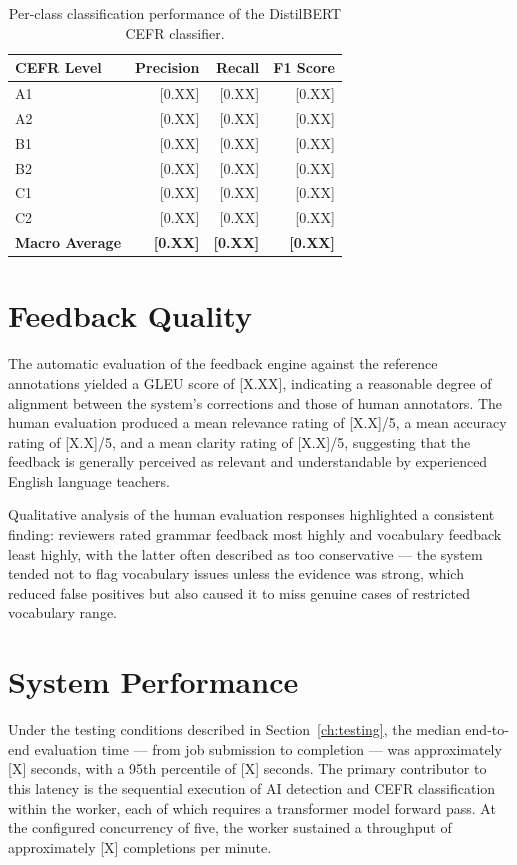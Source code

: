 \documentclass[12pt, a4paper]{report}
\begin{document}
\begin{table}[H]
\centering
\caption{Per-class classification performance of the DistilBERT CEFR classifier.}
\label{tab:classification}
\begin{tabular}{@{}lrrr@{}}
\toprule
\textbf{CEFR Level} & \textbf{Precision} & \textbf{Recall} & \textbf{F1 Score} \\
\midrule
A1 & [0.XX] & [0.XX] & [0.XX] \\
A2 & [0.XX] & [0.XX] & [0.XX] \\
B1 & [0.XX] & [0.XX] & [0.XX] \\
B2 & [0.XX] & [0.XX] & [0.XX] \\
C1 & [0.XX] & [0.XX] & [0.XX] \\
C2 & [0.XX] & [0.XX] & [0.XX] \\
\midrule
\textbf{Macro Average} & \textbf{[0.XX]} & \textbf{[0.XX]} & \textbf{[0.XX]} \\
\bottomrule
\end{tabular}
\end{table}

\section{Feedback Quality}

The automatic evaluation of the feedback engine against the reference annotations yielded a GLEU score of [X.XX], indicating a reasonable degree of alignment between the system's corrections and those of human annotators. The human evaluation produced a mean relevance rating of [X.X]/5, a mean accuracy rating of [X.X]/5, and a mean clarity rating of [X.X]/5, suggesting that the feedback is generally perceived as relevant and understandable by experienced English language teachers.

Qualitative analysis of the human evaluation responses highlighted a consistent finding: reviewers rated grammar feedback most highly and vocabulary feedback least highly, with the latter often described as too conservative — the system tended not to flag vocabulary issues unless the evidence was strong, which reduced false positives but also caused it to miss genuine cases of restricted vocabulary range.

\section{System Performance}

Under the testing conditions described in Section~\ref{ch:testing}, the median end-to-end evaluation time — from job submission to completion — was approximately [X] seconds, with a 95th percentile of [X] seconds. The primary contributor to this latency is the sequential execution of AI detection and CEFR classification within the worker, each of which requires a transformer model forward pass. At the configured concurrency of five, the worker sustained a throughput of approximately [X] completions per minute.
\end{document}

